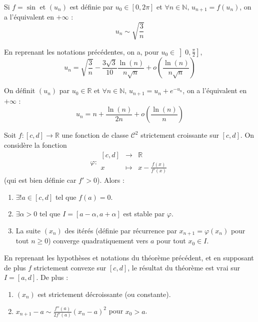   \begin{example}
    Si $f = \sin$ et $(u_n)$ est définie par $u_0 \in [0, 2\pi]$ et $\forall n \in \mathbb{N}, \, u_{n+1} = f(u_n)$, on a l'équivalent en $+\infty$ :
    \[ u_n \sim \sqrt{\frac{3}{n}} \]
  \end{example}


  \begin{proposition}
    En reprenant les notations précédentes, on a, pour $u_0 \in \left] 0, \frac{\pi}{2} \right]$,
    \[ u_n = \sqrt{\frac{3}{n}} - \frac{3 \sqrt{3}}{10} \frac{\ln(n)}{n\sqrt{n}} + o\left( \frac{\ln(n)}{n\sqrt{n}} \right) \]
  \end{proposition}


  \begin{example}
    On définit $(u_n)$ par $u_0 \in \mathbb{R}$ et $\forall n \in \mathbb{N}, \, u_{n+1} = u_n + e^{-u_n}$, on a l'équivalent en $+\infty$ :
    \[ u_n = n + \frac{\ln(n)}{2n} + o\left( \frac{\ln(n)}{n} \right) \]
  \end{example}


  \begin{theorem}
    Soit $f : [c, d] \rightarrow \mathbb{R}$ une fonction de classe $\mathcal{C}^2$ strictement croissante sur $[c, d]$. On considère la fonction
    \[ \varphi :
    \begin{array}{ccc}
      [c, d] &\rightarrow& \mathbb{R} \\
      x &\mapsto& x - \frac{f(x)}{f'(x)}
    \end{array}
    \]
    (qui est bien définie car $f' > 0$). Alors :
    \begin{enumerate}[label=(\roman*)]
      \item $\exists! a \in [c, d]$ tel que $f(a) = 0$.
      \item $\exists \alpha > 0$ tel que $I = [a - \alpha, a + \alpha]$ est stable par $\varphi$.
      \item La suite $(x_n)$ des itérés (définie par récurrence par $x_{n+1} = \varphi(x_n)$ pour tout $n \geq 0$) converge quadratiquement vers $a$ pour tout $x_0 \in I$.
    \end{enumerate}
  \end{theorem}

  \begin{corollary}
    En reprenant les hypothèses et notations du théorème précédent, et en supposant de plus $f$ strictement convexe sur $[c, d]$, le résultat du théorème est vrai sur $I = [a, d]$. De plus :
    \begin{enumerate}[label=(\roman*)]
      \item $(x_n)$ est strictement décroissante (ou constante).
      \item $x_{n+1} - a \sim \frac{f''(a)}{2f'(a)} (x_n - a)^2$ pour $x_0 > a$.
    \end{enumerate}
  \end{corollary}

